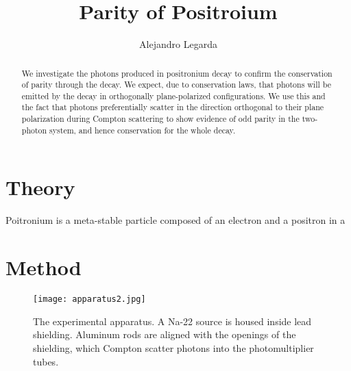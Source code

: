 \documentclass{article}
\title{Parity of Positroium}
\author{Alejandro Legarda}
\begin{document}
\raggedright
\maketitle

\begin{abstract}
We investigate the photons produced in positronium decay to confirm the conservation of parity through the decay. We expect, due to conservation laws, that photons will be emitted by the decay in orthogonally plane-polarized configurations. We use this and the fact that photons preferentially scatter in the direction orthogonal to their plane polarization during Compton scattering to show evidence of odd parity in the two-photon system, and hence conservation for the whole decay.
\end{abstract}

\tableofcontents
\newpage


\section{Theory}
Poitronium is a meta-stable particle composed of an electron and a positron in a


\section{Method}

\begin{figure}[!htb]
	\centering
	\texttt{[image: apparatus2.jpg]}
  	\caption{The experimental apparatus. A Na-22 source is housed inside lead shielding. Aluminum rods are aligned with the openings of the shielding, which Compton scatter photons into the photomultiplier tubes.} 
 	\label{Apparatus}
\end{figure}
\end{document}
